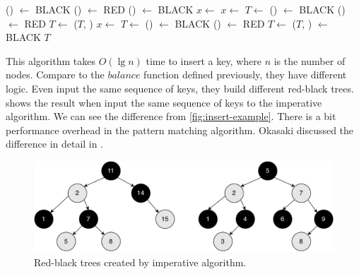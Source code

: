 \documentclass[b5paper]{article}
\begin{document}
\begin{algorithmic}[1]
      \State {}() $\gets$ BLACK
      \State {}() $\gets$ RED
      \State {}() $\gets$ BLACK
      \State $x \gets$ 
    \Else
          \State $x \gets$ 
          \State $T \gets$ 
        \EndIf
        \State {}() $\gets$ BLACK
        \State {}() $\gets$ RED
        \State $T \gets$ ($T$, )
      \Else
          \State $x \gets$ 
          \State $T \gets$ 
        \EndIf
        \State {}() $\gets$ BLACK
        \State {}() $\gets$ RED
        \State $T \gets$ ($T$, )
      \EndIf
    \EndIf
  \EndWhile
  \State {} $\gets$ BLACK
  \State \Return $T$
\EndFunction
\end{algorithmic}

This algorithm takes $O(\lg n)$ time to insert a key, where $n$ is the number of nodes. Compare to the $balance$ function defined previously, they have different logic. Even input the same sequence of keys, they build different red-black trees.  shows the result when input the same sequence of keys to the imperative algorithm. We can see the difference from \cref{fig:insert-example}. There is a bit performance overhead in the pattern matching algorithm. Okasaki discussed the difference in detail in \cite{okasaki}.

\begin{figure}[htbp]
   \centering
   \includegraphics[scale=0.5]{img/imperative-insert}
   \caption{Red-black trees created by imperative algorithm.}
   \label{fig:imperative-insert}
\end{figure}
\end{document}
